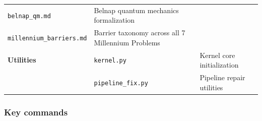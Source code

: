 \documentclass[12pt,a4paper]{article}
\begin{document}
\begin{longtable}[]{@{}lll@{}}
\begin{minipage}[t]{0.23\columnwidth}
\texttt{belnap\_qm.md}\strut
\end{minipage} & \begin{minipage}[t]{0.26\columnwidth}\raggedright
Belnap quantum mechanics formalization\strut
\end{minipage} & \begin{minipage}[t]{0.42\columnwidth}\raggedright
\strut
\end{minipage}\tabularnewline
\begin{minipage}[t]{0.23\columnwidth}\raggedright
\texttt{millennium\_barriers.md}\strut
\end{minipage} & \begin{minipage}[t]{0.26\columnwidth}\raggedright
Barrier taxonomy across all 7 Millennium Problems\strut
\end{minipage} & \begin{minipage}[t]{0.42\columnwidth}\raggedright
\strut
\end{minipage}\tabularnewline
\begin{minipage}[t]{0.23\columnwidth}\raggedright
\textbf{Utilities}\strut
\end{minipage} & \begin{minipage}[t]{0.26\columnwidth}\raggedright
\texttt{kernel.py}\strut
\end{minipage} & \begin{minipage}[t]{0.42\columnwidth}\raggedright
Kernel core initialization\strut
\end{minipage}\tabularnewline
\begin{minipage}[t]{0.23\columnwidth}\raggedright
\strut
\end{minipage} & \begin{minipage}[t]{0.26\columnwidth}\raggedright
\texttt{pipeline\_fix.py}\strut
\end{minipage} & \begin{minipage}[t]{0.42\columnwidth}\raggedright
Pipeline repair utilities\strut
\end{minipage}\tabularnewline
\bottomrule
\end{longtable}

\hypertarget{key-commands}{%
\subsubsection{Key commands}\label{key-commands}}
\end{document}
